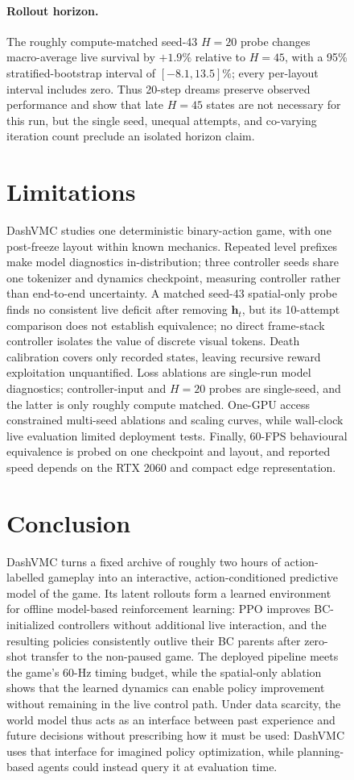 \begin{figure}[!htbp]
\FloatBarrier
\paragraph{Rollout horizon.}

The roughly compute-matched seed-43 \(H=20\) probe changes macro-average live survival by \(+1.9\%\) relative to \(H=45\), with a 95\% stratified-bootstrap interval of \([-8.1,13.5]\%\); every per-layout interval includes zero.
Thus 20-step dreams preserve observed performance and show that late \(H=45\) states are not necessary for this run, but the single seed, unequal attempts, and co-varying iteration count preclude an isolated horizon claim.

\FloatBarrier
\section{Limitations}
\label{sec:limitations}

DashVMC studies one deterministic binary-action game, with one post-freeze layout within known mechanics.
Repeated level prefixes make model diagnostics in-distribution; three controller seeds share one tokenizer and dynamics checkpoint, measuring controller rather than end-to-end uncertainty.
A matched seed-43 spatial-only probe finds no consistent live deficit after removing \(\mathbf h_t\), but its 10-attempt comparison does not establish equivalence; no direct frame-stack controller isolates the value of discrete visual tokens.
Death calibration covers only recorded states, leaving recursive reward exploitation unquantified.
Loss ablations are single-run model diagnostics; controller-input and \(H=20\) probes are single-seed, and the latter is only roughly compute matched.
One-GPU access constrained multi-seed ablations and scaling curves, while wall-clock live evaluation limited deployment tests.
Finally, 60-FPS behavioural equivalence is probed on one checkpoint and layout, and reported speed depends on the RTX 2060 and compact edge representation.

\FloatBarrier
\section{Conclusion}
\label{sec:conclusion}

DashVMC turns a fixed archive of roughly two hours of action-labelled gameplay into an interactive, action-conditioned predictive model of the game.
Its latent rollouts form a learned environment for offline model-based reinforcement learning: PPO improves BC-initialized controllers without additional live interaction, and the resulting policies consistently outlive their BC parents after zero-shot transfer to the non-paused game.
The deployed pipeline meets the game's 60-Hz timing budget, while the spatial-only ablation shows that the learned dynamics can enable policy improvement without remaining in the live control path.
Under data scarcity, the world model thus acts as an interface between past experience and future decisions without prescribing how it must be used: DashVMC uses that interface for imagined policy optimization, while planning-based agents could instead query it at evaluation time.


\end{figure}
